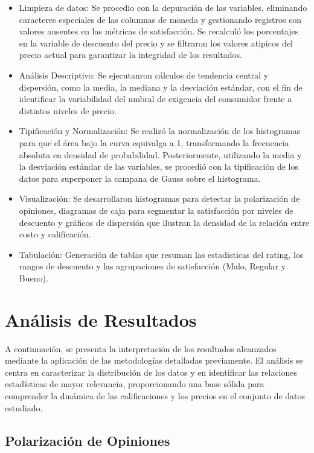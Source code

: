 \documentclass[oneside,11pt]{Latex/Classes/PhDthesisPSnPDF}
\begin{document}
\begin{itemize}
  \item {Limpieza de datos: Se procedio con la depuración de las variables, eliminando caracteres especiales de las columnas de moneda y gestionando registros con valores ausentes en las métricas de satisfacción. Se recalculó los porcentajes en la variable de descuento del precio y se filtraron los valores atipicos del precio actual para garantizar la integridad de los resultados. }
  \item{Análisis Descriptivo: Se ejecutanron cálculos de tendencia central y dispersión, como la media, la mediana y la desviación estándar, con el fin de identificar la variabilidad del umbral de exigencia del consumidor frente a distintos niveles de precio.}
  \item{Tipificación y Normalización: Se realizó la normalización de los histogramas para que el área bajo la curva equivalga a 1, transformando la frecuencia absoluta en densidad de probabilidad. Posteriormente, utilizando la media y la desviación estándar de las variables, se procedió con la tipificación de los datos para superponer la campana de Gauss sobre el histograma.}
  \item{Visualización: Se desarrollaron histogramas para detectar la polarización de opiniones, diagramas de caja para segmentar la satisfacción por niveles de descuento y gráficos de dispersión que ilustran la densidad de la relación entre costo y calificación.}
  \item{Tabulación: Generación de tablas que resuman las estadisticas del rating, los rangos de descuento y las agrupaciones de satisfacción (Malo, Regular y Bueno).}
\end{itemize}

\chapter{Análisis de Resultados}

\small A continuación, se presenta la interpretación de los resultados
alcanzados mediante la aplicación de las metodologías detalladas
previamente. El análisis se centra en caracterizar la distribución de
los datos y en identificar las relaciones estadísticas de mayor
relevancia, proporcionando una base sólida para comprender la dinámica
de las calificaciones y los precios en el conjunto de datos estudiado.

\section{Polarización de Opiniones}
\end{document}

